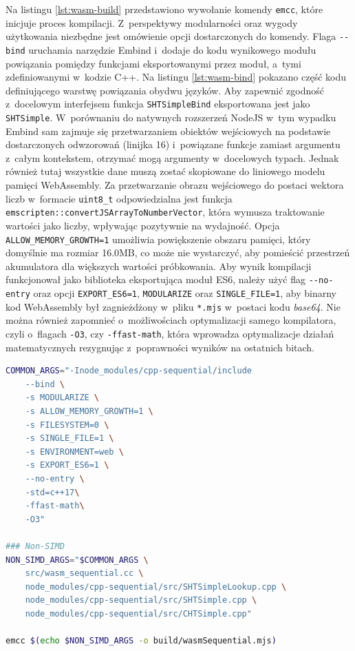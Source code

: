 Na listingu \ref{lst:wasm-build} przedstawiono wywołanie komendy \lstinline{emcc}, które inicjuje proces kompilacji. Z~perspektywy modularności oraz wygody użytkowania niezbędne jest omówienie opcji dostarczonych do komendy. Flaga \lstinline{--bind} uruchamia narzędzie Embind i~dodaje do kodu wynikowego modułu powiązania pomiędzy funkcjami eksportowanymi przez moduł, a~tymi zdefiniowanymi w~kodzie C++. Na listingu \ref{lst:wasm-bind} pokazano część kodu definiującego warstwę powiązania obydwu języków. Aby zapewnić zgodność z~docelowym interfejsem funkcja \lstinline{SHTSimpleBind} eksportowana jest jako \lstinline{SHTSimple}. W~porównaniu do natywnych rozszerzeń NodeJS w~tym wypadku Embind sam zajmuje się przetwarzaniem obiektów wejściowych na podstawie dostarczonych odwzorowań (linijka 16) i~powiązane funkcje zamiast argumentu z~całym kontekstem, otrzymać mogą argumenty w~docelowych typach. Jednak również tutaj wszystkie dane muszą zostać skopiowane do liniowego modelu pamięci WebAssembly. Za przetwarzanie obrazu wejściowego do postaci wektora liczb w~formacie \lstinline{uint8_t} odpowiedzialna jest funkcja \lstinline{emscripten::convertJSArrayToNumberVector}, która wymusza traktowanie wartości jako liczby, wpływając pozytywnie na wydajność. Opcja \lstinline{ALLOW_MEMORY_GROWTH=1} umożliwia powiększenie obszaru pamięci, który domyślnie ma rozmiar 16.0MB, co może nie wystarczyć, aby pomieścić przestrzeń akumulatora dla większych wartości próbkowania. Aby wynik kompilacji funkcjonował jako biblioteka eksportująca moduł ES6, należy użyć flag \lstinline{--no-entry} oraz opcji \lstinline{EXPORT_ES6=1}, \lstinline{MODULARIZE} oraz \lstinline{SINGLE_FILE=1}, aby binarny kod WebAssembly był zagnieżdżony w~pliku \lstinline{*.mjs} w~postaci kodu \textit{base64}. Nie można również zapomnieć o~możliwościach optymalizacji samego kompilatora, czyli o~flagach \lstinline{-O3}, czy \lstinline{-ffast-math}, która wprowadza optymalizacje działań matematycznych rezygnując z~poprawności wyników na ostatnich bitach.

\begin{lstlisting}[language=bash, float=ht, label=lst:wasm-build, caption=Komenda wykorzystana podczas kompilacji kodu C++ do modułu WebAssembly., showstringspaces=false]
COMMON_ARGS="-Inode_modules/cpp-sequential/include 
    --bind \
    -s MODULARIZE \
    -s ALLOW_MEMORY_GROWTH=1 \
    -s FILESYSTEM=0 \
    -s SINGLE_FILE=1 \
    -s ENVIRONMENT=web \
    -s EXPORT_ES6=1 \
    --no-entry \
    -std=c++17\
    -ffast-math\
    -O3"

### Non-SIMD
NON_SIMD_ARGS="$COMMON_ARGS \
    src/wasm_sequential.cc \
    node_modules/cpp-sequential/src/SHTSimpleLookup.cpp \
    node_modules/cpp-sequential/src/SHTSimple.cpp \
    node_modules/cpp-sequential/src/CHTSimple.cpp"

emcc $(echo $NON_SIMD_ARGS -o build/wasmSequential.mjs)
\end{lstlisting}

